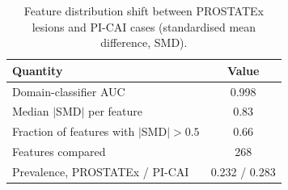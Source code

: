 \begin{table}[tbp]
\centering
\caption{Feature distribution shift between PROSTATEx lesions and PI-CAI cases (standardised mean difference, SMD).}
\label{tab:s_domain_shift}
\small
\begin{tabular}{lc}
\toprule
Quantity & Value \\
\midrule
Domain-classifier AUC & \num{0.998} \\
Median $|$SMD$|$ per feature & \num{0.83} \\
Fraction of features with $|$SMD$| > \num{0.5}$ & \num{0.66} \\
Features compared & \num{268} \\
Prevalence, PROSTATEx / PI-CAI & \num{0.232} / \num{0.283} \\
\bottomrule
\end{tabular}
\end{table}
